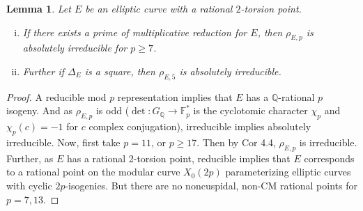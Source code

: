 \documentclass[12pt]{amsart}
\newtheorem{lem}[thm]{Lemma}
\theoremstyle{definition}
\def\F{{\mathbb F}}
\def\Q{{\mathbb Q}}
\begin{document}
\begin{lem}\label{absirr}
Let $E$ be an elliptic curve with a rational $2$-torsion point.   
\begin{enumerate}[(i)]
\item If there exists a prime of multiplicative reduction for $E$, then $\rho_{E,p}$ is absolutely irreducible for $p \geq 7$.
\item Further if $\Delta_E$ is a square, then $\rho_{E,5}$ is absolutely irreducible.
\end{enumerate}
\end{lem}
\begin{proof}
A reducible mod $p$ representation implies that $E$ has a $\Q$-rational $p$ isogeny.  And as $\rho_{E,p}$ is odd ($\det \colon G_\Q \rightarrow \F_p^*$ is the cyclotomic character $\chi_p$ and $\chi_p(c)=-1$ for $c$ complex conjugation), irreducible implies absolutely irreducible.  
Now, first take $p =11$, or $p \geq 17$.  Then by \cite{mazur78} Cor 4.4, $\rho_{E,p}$ is irreducible.  Further, as $E$ has a rational 2-torsion point, reducible implies that $E$ corresponds to a rational point on the modular curve $X_0(2p)$ parameterizing elliptic curves with cyclic $2p$-isogenies.  But there are no noncuspidal, non-CM rational points for $p = 7,13$.


\end{proof}
\end{document}
